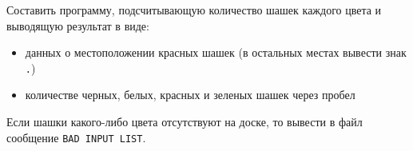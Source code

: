 Составить программу, подсчитывающую количество шашек каждого цвета и выводящую результат в виде:
\begin{itemize}
\item данных о местоположении красных шашек (в остальных местах вывести знак \texttt{.})
\item количестве черных, белых, красных и зеленых шашек через пробел
\end{itemize}
Если шашки какого-либо цвета отсутствуют на доске, то вывести в файл сообщение \texttt{BAD INPUT LIST}.